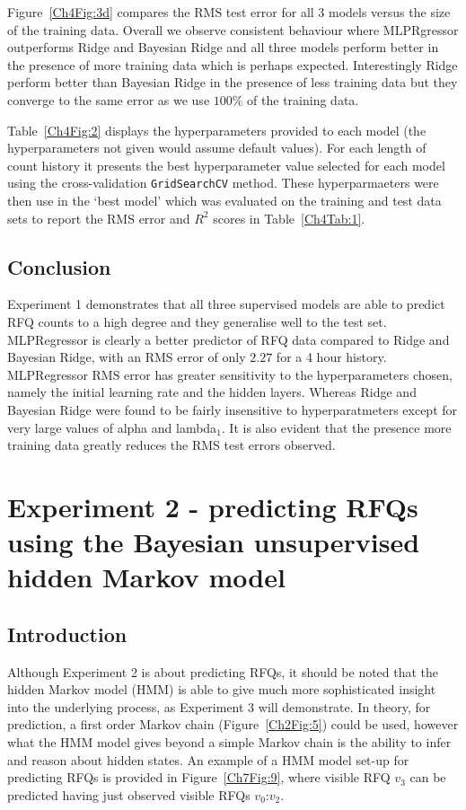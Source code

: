 Figure~\ref{Ch4Fig:3d} compares the RMS test error for all 3 models versus the size of the training data. Overall we observe consistent behaviour where MLPRgressor outperforms Ridge and Bayesian Ridge and all three models perform better in the presence of more training data which is perhaps expected. Interestingly Ridge perform better than Bayesian Ridge in the presence of less training data but they converge to the same error as we use $100\%$ of the training data. 


Table~\ref{Ch4Fig:2} displays the hyperparameters provided to each model (the hyperparameters not given would assume default values). For each length of count history it presents the best hyperparameter value selected for each model using the cross-validation \texttt{GridSearchCV} method. These hyperparmaeters were then use in the `best model' which was evaluated on the training and test data sets to report the RMS error and $R^2$ scores in Table~\ref{Ch4Tab:1}.



\subsection{Conclusion}

Experiment 1 demonstrates that all three supervised models are able to predict RFQ counts to a high degree and they generalise well to the test set. MLPRegressor is clearly a better predictor of RFQ data compared to Ridge and Bayesian Ridge, with an RMS error of only $2.27$ for a 4 hour history.  MLPRegressor RMS error has greater sensitivity to the hyperparameters chosen, namely the initial learning rate and the hidden layers. Whereas Ridge and Bayesian Ridge were found to be fairly insensitive to hyperparatmeters except for very large values of alpha and lambda$_1$. It is also evident that the presence more training data greatly reduces the RMS test errors observed.


\section{Experiment 2 - predicting RFQs using the Bayesian unsupervised hidden Markov model}

\subsection{Introduction}

Although Experiment 2 is about predicting RFQs, it should be noted that the hidden Markov model (HMM) is able to give much more sophisticated insight into the underlying process, as Experiment 3 will demonstrate. In theory, for prediction, a first order Markov chain (Figure~\ref{Ch2Fig:5}) could be used, however what the HMM model gives beyond a simple Markov chain is the ability to infer and reason about hidden states. An example of a HMM model set-up for predicting RFQs is provided in Figure~\ref{Ch7Fig:9}, where visible RFQ $v_3$ can be predicted having just observed visible RFQs $v_0\text{:}v_2$. 

